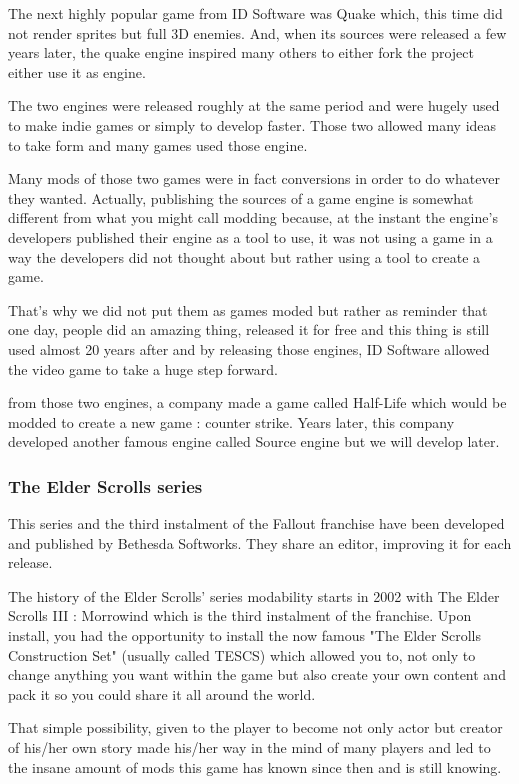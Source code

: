 \documentclass[a4paper,12pt]{article}
\begin{document}
The next highly popular game from ID Software was Quake which, this time did not render sprites but full 3D enemies. And, when its sources were released a few years later, the quake engine inspired many others to either fork the project either use it as engine.

The two engines were released roughly at the same period and were hugely used to make indie games or simply to develop faster. Those two allowed many ideas to take form and many games used those engine.

Many mods of those two games were in fact conversions in order to do whatever they wanted. Actually, publishing the sources of a game engine is somewhat different from what you might call modding because, at the instant the engine's developers published their engine as a tool to use, it was not using a game in a way the developers did not thought about but rather using a tool to create a game.

That's why we did not put them as games moded but rather as reminder that one day, people did an amazing thing, released it for free and this thing is still used almost 20 years after and by releasing those engines, ID Software allowed the video game to take a huge step forward.

from those two engines, a company made a game called Half-Life which would be modded to create a new game : counter strike. Years later, this company developed another famous engine called Source engine but we will develop later.

\subsubsection{The Elder Scrolls series}

This series and the third instalment of the Fallout franchise have been developed and published by Bethesda Softworks. They share an editor, improving it for each release.

The history of the Elder Scrolls' series modability starts in 2002 with The Elder Scrolls III : Morrowind which is the third instalment of the franchise. Upon install, you had the opportunity to install the now famous "The Elder Scrolls Construction Set" (usually called TESCS) which allowed you to, not only to change anything you want within the game but also create your own content and pack it so you could share it all around the world.

That simple possibility, given to the player to become not only actor but creator of his/her own story made his/her way in the mind of many players and led to the insane amount of mods this game has known since then and is still knowing.
\end{document}
